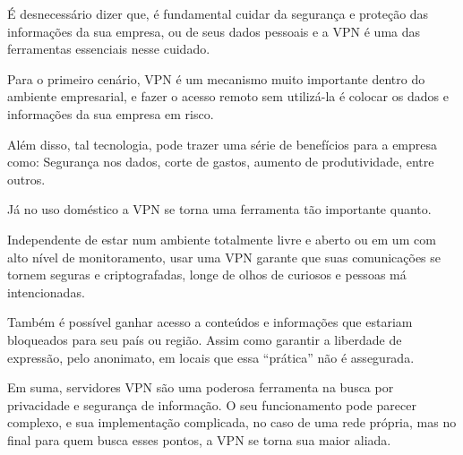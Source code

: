 \documentclass[12pt]{article}
\begin{document}
\begin{flushleft}
É desnecessário dizer que, é fundamental cuidar da segurança e proteção das informações da sua empresa, ou de seus dados pessoais e a VPN é uma das ferramentas essenciais nesse cuidado.

Para o primeiro cenário, VPN é um mecanismo muito importante dentro do ambiente empresarial, e fazer o acesso remoto sem utilizá-la é colocar os dados e informações da sua empresa em risco.

Além disso, tal tecnologia, pode trazer uma série de benefícios para a empresa como: Segurança nos dados, corte de gastos, aumento de produtividade, entre outros.

Já no uso doméstico a VPN se torna uma ferramenta tão importante quanto. 

Independente de estar num ambiente totalmente livre e aberto ou em um com alto nível de monitoramento, usar uma VPN garante que suas comunicações se tornem seguras e criptografadas, longe de olhos de curiosos e pessoas má intencionadas.

Também é possível ganhar acesso a conteúdos e informações que estariam bloqueados para seu país ou região. Assim como garantir a liberdade de expressão, pelo anonimato, em locais que essa “prática” não é assegurada. 

Em suma, servidores VPN são uma poderosa ferramenta na busca por privacidade e segurança de informação. O seu funcionamento pode parecer complexo, e sua implementação complicada, no caso de uma rede própria, mas no final para quem busca esses pontos, a VPN se torna sua maior aliada.






\cite{hostone:100}
\cite{stackexchange:101}
\cite{compugraf:103}
\cite{starti:104}

\end{flushleft}
\end{document}
